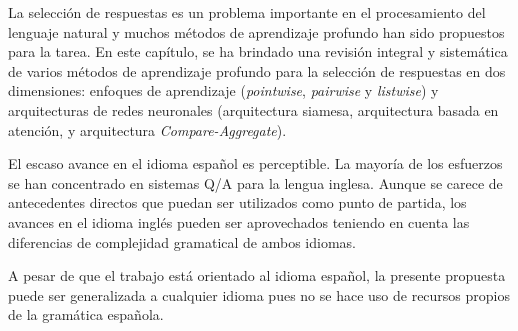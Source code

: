 La selección de respuestas es un problema importante en el procesamiento del lenguaje natural y muchos métodos de aprendizaje profundo han sido propuestos para la tarea. En este capítulo, se ha brindado una revisión integral y sistemática de varios métodos de aprendizaje profundo para la selección de respuestas en dos dimensiones: enfoques de aprendizaje (\textit{pointwise}, \textit{pairwise} y \textit{listwise}) y arquitecturas de redes neuronales (arquitectura siamesa, arquitectura basada en atención, y arquitectura \textit{Compare-Aggregate}).

El escaso avance en el idioma español es perceptible. La mayoría de los esfuerzos se han concentrado en sistemas Q/A para la lengua inglesa. Aunque se carece de antecedentes directos que puedan ser utilizados como punto de partida, los avances en el idioma inglés pueden ser aprovechados teniendo en cuenta las diferencias de complejidad gramatical de ambos idiomas.

A pesar de que el trabajo está orientado al idioma español, la presente propuesta puede ser generalizada a cualquier idioma pues no se hace uso de recursos propios de la gramática española.
